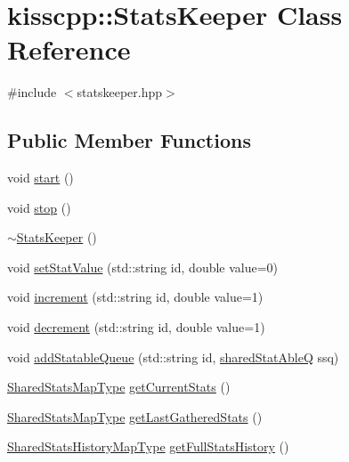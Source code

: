 \hypertarget{classkisscpp_1_1_stats_keeper}{\section{kisscpp\-:\-:Stats\-Keeper Class Reference}
\label{classkisscpp_1_1_stats_keeper}
}


{\ttfamily \#include $<$statskeeper.\-hpp$>$}

\subsection*{Public Member Functions}
\begin{DoxyCompactItemize}
\item 
void \hyperlink{classkisscpp_1_1_stats_keeper_a1d75a31af13458128e88afaf95280357}{start} ()
\item 
void \hyperlink{classkisscpp_1_1_stats_keeper_a4f6a639706fc26b421bc9ab2f0ef9ca0}{stop} ()
\item 
\hyperlink{classkisscpp_1_1_stats_keeper_adc9c6986efc28efc5198f579c3093a6f}{$\sim$\-Stats\-Keeper} ()
\item 
void \hyperlink{classkisscpp_1_1_stats_keeper_abea7ffc45ac76e92dc2cf9db86040336}{set\-Stat\-Value} (std\-::string id, double value=0)
\item 
void \hyperlink{classkisscpp_1_1_stats_keeper_a1d7da29c8056a6280eeb54371f1a7ac3}{increment} (std\-::string id, double value=1)
\item 
void \hyperlink{classkisscpp_1_1_stats_keeper_ae41c3d5bc4373f271ae773f81f3f294a}{decrement} (std\-::string id, double value=1)
\item 
void \hyperlink{classkisscpp_1_1_stats_keeper_ab7899e972216b5c6281db4cfd7d2be0d}{add\-Statable\-Queue} (std\-::string id, \hyperlink{namespacekisscpp_a141592ccd82280d2692ca3b9b490faab}{shared\-Stat\-Able\-Q} ssq)
\item 
\hyperlink{namespacekisscpp_aec223e8bce5f3988c62ceb0ccad11a68}{Shared\-Stats\-Map\-Type} \hyperlink{classkisscpp_1_1_stats_keeper_a031493a516bae72e9b56ccf52d93ed5e}{get\-Current\-Stats} ()
\item 
\hyperlink{namespacekisscpp_aec223e8bce5f3988c62ceb0ccad11a68}{Shared\-Stats\-Map\-Type} \hyperlink{classkisscpp_1_1_stats_keeper_a6352b48ba6b6e4122ba0f1c28a5a581c}{get\-Last\-Gathered\-Stats} ()
\item 
\hyperlink{namespacekisscpp_afa626c76d3dca5d5e1be4146f211fefa}{Shared\-Stats\-History\-Map\-Type} \hyperlink{classkisscpp_1_1_stats_keeper_a4678b93e4ba79c70ddefaf8d22994ed3}{get\-Full\-Stats\-History} ()
\end{DoxyCompactItemize}
